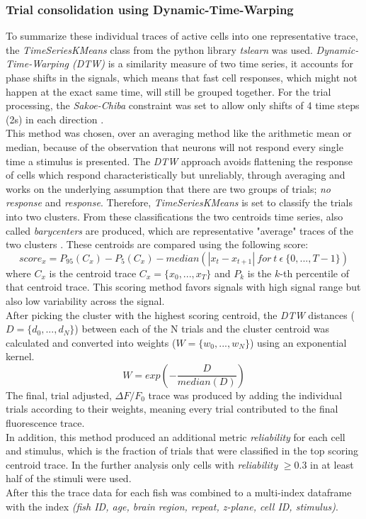 \documentclass[12pt, a4paper, oneside]{article}
\begin{document}
\subsubsection{Trial consolidation using Dynamic-Time-Warping}
\label{sec:dtw trials}
To summarize these individual traces of active cells into one representative trace, the \textit{TimeSeriesKMeans} class from the python library \textit{tslearn} \parencite{tavenardTslearnMachineLearning2020} was used. \textit{Dynamic-Time-Warping (DTW)} is a similarity measure of two time series, it accounts for phase shifts in the signals, which means that fast cell responses, which might not happen at the exact same time, will still be grouped together. For the trial processing, the \textit{Sakoe-Chiba} constraint was set to allow only shifts of 4 time steps (2s) in each direction \parencite{sakoeDynamicProgrammingAlgorithm1978b}.\\
This method was chosen, over an averaging method like the arithmetic mean or median, because of the observation %
that neurons will not respond every single time a stimulus is presented. The \textit{DTW} approach avoids flattening the response of cells which respond characteristically but unreliably, through averaging and works on the underlying assumption that there are two groups of trials; \textit{no response} and \textit{response}. Therefore, \textit{TimeSeriesKMeans} is set to classify the trials into two clusters. From these classifications the two centroids time series, also called \textit{barycenters} are produced, which are representative "average" traces of the two clusters \parencite{petitjeanGlobalAveragingMethod2011}. These centroids are compared using the following score:
\[
score_x = P_{95}(C_x) - P_{5}(C_x) - median(|x_t-x_{t+1}|\ for \ t\ \epsilon\ \{0,...,T-1\})
\]
where $C_x$ is the centroid trace $C_x = \{x_0,..., x_T\}$ and $P_k$ is the $k$-th percentile of that centroid trace. This scoring method favors signals with high signal range but also low variability across the signal.\\
After picking the cluster with the highest scoring centroid, the \textit{DTW} distances ($D=\{d_0,...,d_N\}$) between each of the N trials and the cluster centroid was calculated and converted into weights ($W=\{w_0,..., w_N\}$) using an exponential kernel.
\[
W = exp(-\frac{D}{median(D)})
\]
The final, trial adjusted, $\Delta F/F_0$ trace was produced by adding the individual trials according to their weights, meaning every trial contributed to the final fluorescence trace.\\
In addition, this method produced an additional metric \textit{reliability} for each cell and stimulus, which is the fraction of trials that were classified in the top scoring centroid trace. In the further analysis only cells with \textit{reliability} $\geq 0.3$ in at least half of the stimuli were used.\\
After this the trace data for each fish was combined to a multi-index dataframe with the index \textit{(fish ID, age, brain region, repeat, z-plane, cell ID, stimulus)}.\\
\end{document}
